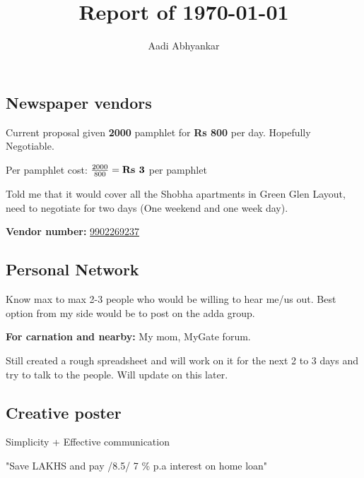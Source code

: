 \documentclass[12pt, a4paper]{article}
\begin{document}
\title{Report of \today}
\author{Aadi Abhyankar}
\maketitle

\subsection{Newspaper vendors}

Current proposal given \textbf{2000} pamphlet for \textbf{Rs 800} per day. Hopefully Negotiable.

\vspace{0.5cm}

Per pamphlet cost: $\frac{2000}{800} = \textbf{Rs \the\numexpr 2000 / 800 \relax} $ per pamphlet

\bigskip

\noindent Told me that it would cover all the Shobha apartments in Green Glen Layout, need to negotiate for two days (One weekend and one week day).

\bigskip

\textbf{Vendor number:} \href{tel:+919902269237}{9902269237}

\subsection{Personal Network}

Know max to max 2-3 people who would be willing to hear me/us out. Best option from my side would be to post on the adda group.

\vspace{0.25cm}

\noindent \textbf{For carnation and nearby:} My mom, MyGate forum.

\vspace{0.25cm}

\noindent Still created a rough spreadsheet and will work on it for the next 2 to 3 days and try to talk to the people. Will update on this later.

\subsection{Creative poster}

Simplicity + Effective communication

\vspace{0.3cm}

"Save LAKHS and pay /8.5/ 7 \% p.a interest on home loan"
\end{document}
